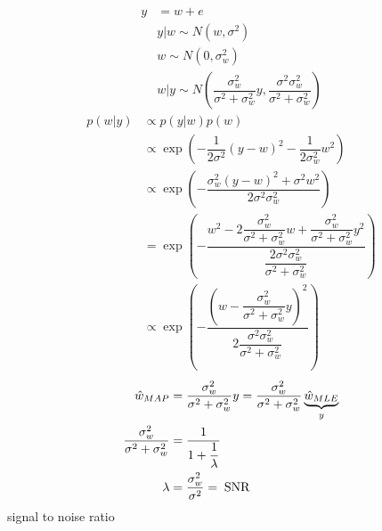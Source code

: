 \documentclass{article}
\begin{document}
\begin{align*}
y  &= w + e 
\\ &  y  | w \sim  N\left(w, \sigma^{2}\right)
\\ &  w  \sim  N\left(0, \sigma_{w}^{2}\right)
\\ &  w  | y \sim  N\left(\dfrac{\sigma_{w}^{2}}{\sigma^{2} + \sigma_{w}^{2}} y, \dfrac{\sigma^{2} \sigma_{w}^{2}}{\sigma^{2} + \sigma_{w}^{2}}\right)
\end{align*}
\begin{align*}
p\left(w | y\right)  &  \propto p\left(y | w\right) p\left(w \right)
\\ &  \propto \exp\left(- \dfrac{1}{2 \sigma^{2}} \left(y - w\right)^{2}  - \dfrac{1}{2 \sigma_{w}^{2}} w^{2}\right)
\\ &  \propto \exp\left(- \dfrac{\sigma_{w}^{2} \left(y - w\right)^{2} + \sigma^{2} w^{2}}{2 \sigma^{2} \sigma_{w}^{2}}\right)
\\ &= \exp\left(- \dfrac{w^{2} - 2 \dfrac{\sigma_{w}^{2}}{\sigma^{2} + \sigma_{w}^{2}} w + \dfrac{\sigma_{w}^{2}}{\sigma^{2} + \sigma_{w}^{2}} y^{2}}{\dfrac{2 \sigma^{2} \sigma_{w}^{2}}{\sigma^{2} + \sigma_{w}^{2}}}\right)
\\ &  \propto \exp\left(- \dfrac{\left(w - \dfrac{\sigma_{w}^{2}}{\sigma^{2} + \sigma_{w}^{2}} y\right)^{2}}{2 \dfrac{\sigma^{2} \sigma_{w}^{2}}{\sigma^{2} + \sigma_{w}^{2}}}\right)
\end{align*}
\begin{align*}
\hat{w}_{MAP} &= \dfrac{\sigma_{w}^{2}}{\sigma^{2} + \sigma_{w}^{2}} y  = \dfrac{\sigma_{w}^{2}}{\sigma^{2} + \sigma_{w}^{2}} \underbrace{\hat{w}_{MLE}}_{y}
\\ \dfrac{\sigma_{w}^{2}}{\sigma^{2} + \sigma_{w}^{2}} &= \dfrac{1}{1 + \dfrac{1}{\lambda}}
\\ \lambda &= \dfrac{\sigma_{w}^{2}}{\sigma^{2}} = \text{\;SNR\;}
\end{align*}
signal to noise ratio
\end{document}
